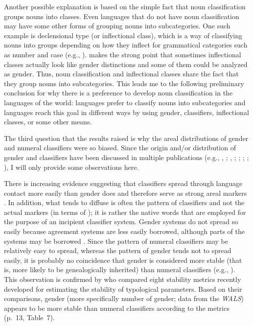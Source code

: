\documentclass[output=collectionpaper]{langsci/langscibook}
\begin{document}
Another possible explanation is based on the simple fact that noun classification groups nouns into classes. Even languages that do not have noun classification may have some other forms of grouping nouns into subcategories. One such example is declensional type (or inflectional class), which is a way of classifying nouns into groups depending on how they inflect for grammatical categories such as number and case (e.g., \citealt[67--68]{Kramer2015}). \citet[583--584]{Dahl2000} makes the strong point that sometimes inflectional classes actually look like gender distinctions and some of them could be analyzed as gender. Thus, noun classification and inflectional classes share the fact that they group nouns into subcategories. This leads me to the following preliminary conclusion for why there is a preference to develop noun classification in the languages of the world: languages prefer to classify nouns into subcategories and languages reach this goal in different ways by using gender, classifiers, inflectional classes, or some other means.

The third question that the results raised is why the areal distributions of gender and numeral classifiers were so biased. Since the origin and/or distribution of gender and classifiers have been discussed in multiple publications (e.g., \citealt{Corbett1991}, \citealt{Corbett2013}; \citealt{Nichols1992}, \citealt{Nichols2003}; \citealt{Aikhenvald2000}; \citealt{Luraghi2011}; \citealt{Gil2013}; \citealt{Passer2016b}), I will only provide some observations here.

There is increasing evidence suggesting that classifiers spread through language contact more easily than gender does and therefore serve as strong areal markers \citep[730]{Seifart2010}. In addition, what tends to diffuse is often the pattern of classifiers and not the actual markers (in terms of \citealt[234--237]{Matras2009}); it is rather the native words that are employed for the purpose of an incipient classifier system. Gender systems do not spread so easily because agreement systems are less easily borrowed, although parts of the systems may be borrowed \citep[386--388]{Aikhenvald2000}. Since the pattern of numeral classifiers may be relatively easy to spread, whereas the pattern of gender tends not to spread easily, it is probably no coincidence that gender is considered more stable (that is, more likely to be genealogically inherited) than numeral classifiers (e.g., \citealt[299--303]{Nichols2003}). This observation is confirmed by \citet{Dediu2013} who compared eight stability metrics recently developed for estimating the stability of typological parameters. Based on their comparisons, gender (more specifically number of gender; data from the \textit{WALS}) appears to be more stable than numeral classifiers according to the metrics (p.~13, Table~7).
\end{document}

